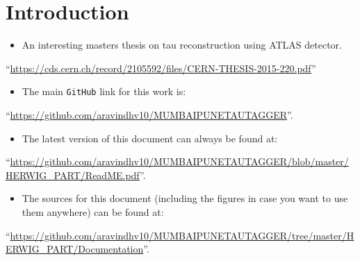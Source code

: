 \section{Introduction}

\begin{itemize}
    \item An interesting masters thesis on tau reconstruction using ATLAS detector.
\end{itemize}
\begin{flushleft}
    ``\small{\url{https://cds.cern.ch/record/2105592/files/CERN-THESIS-2015-220.pdf}}''
\end{flushleft}

\begin{itemize}
\item The main {\tt GitHub} link for this work is:
\end{itemize}
\begin{flushleft}
    ``\small{\url{https://github.com/aravindhv10/MUMBAIPUNETAUTAGGER}}''.
\end{flushleft}

\begin{itemize}
    \item The latest version of this document can always be found at:
\end{itemize}
\begin{flushleft}
    ``\small{\url{https://github.com/aravindhv10/MUMBAIPUNETAUTAGGER/blob/master/HERWIG_PART/ReadME.pdf}}''.
\end{flushleft}

\begin{itemize}
    \item The sources for this document (including the figures in case you want to use them anywhere) can be found at:
\end{itemize}
\begin{flushleft}
    ``\small{\url{https://github.com/aravindhv10/MUMBAIPUNETAUTAGGER/tree/master/HERWIG_PART/Documentation}}''.
\end{flushleft}

